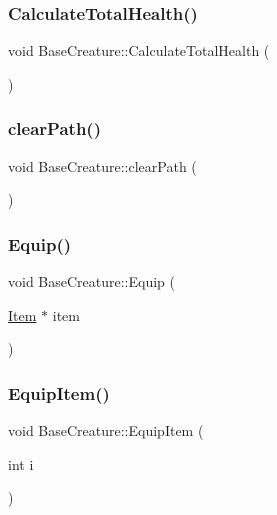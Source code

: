\subsubsection{\texorpdfstring{Calculate\+Total\+Health()}{CalculateTotalHealth()}}
{\footnotesize\ttfamily void Base\+Creature\+::\+Calculate\+Total\+Health (\begin{DoxyParamCaption}{ }\end{DoxyParamCaption})}

\mbox{\label{class_base_creature_a8c7fec43bb0ca9a15e0f2596960283b7}} 
\subsubsection{\texorpdfstring{clear\+Path()}{clearPath()}}
{\footnotesize\ttfamily void Base\+Creature\+::clear\+Path (\begin{DoxyParamCaption}{ }\end{DoxyParamCaption})}

\mbox{\label{class_base_creature_a82807038eafe46f7ac510a99a4cdc25e}} 
\subsubsection{\texorpdfstring{Equip()}{Equip()}}
{\footnotesize\ttfamily void Base\+Creature\+::\+Equip (\begin{DoxyParamCaption}\item[{\mbox{\hyperlink{class_item}{Item}} $\ast$}]{item }\end{DoxyParamCaption})}

\mbox{\label{class_base_creature_a1e73375251b20070ae9dac505b280b3e}} 
\subsubsection{\texorpdfstring{Equip\+Item()}{EquipItem()}}
{\footnotesize\ttfamily void Base\+Creature\+::\+Equip\+Item (\begin{DoxyParamCaption}\item[{int}]{i }\end{DoxyParamCaption})}

